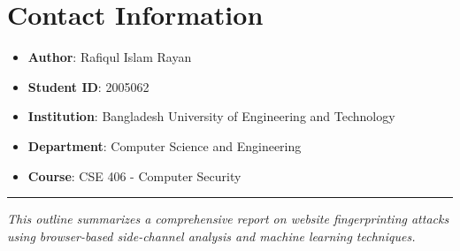 \documentclass[11pt,a4paper]{article}
\begin{document}
\section*{Contact Information}

\begin{itemize}[leftmargin=*]
    \item \textbf{Author}: Rafiqul Islam Rayan
    \item \textbf{Student ID}: 2005062
    \item \textbf{Institution}: Bangladesh University of Engineering and Technology
    \item \textbf{Department}: Computer Science and Engineering
    \item \textbf{Course}: CSE 406 - Computer Security
\end{itemize}

\vfill
\hrule
\begin{center}
\textit{This outline summarizes a comprehensive report on website fingerprinting attacks\\
using browser-based side-channel analysis and machine learning techniques.}
\end{center}
\end{document}

